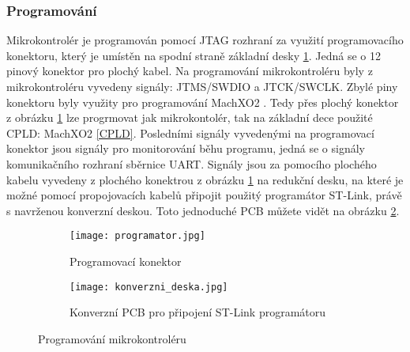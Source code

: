 	\subsubsection{Programování}
	Mikrokontrolér je programován pomocí JTAG rozhraní za využití programovacího konektoru, který je umístěn na spodní straně základní desky \ref{fig:programator}. Jedná se o 12 pinový konektor pro plochý kabel. Na programování mikrokontroléru byly z mikrokontroléru vyvedeny signály: JTMS/SWDIO a JTCK/SWCLK. Zbylé piny konektoru byly využity pro programování MachXO2 \cite{CPLD}. Tedy přes plochý konektor z obrázku \ref{fig:programator} lze progrmovat jak mikrokontolér, tak na základní dece použité CPLD: MachXO2 \ref{CPLD}. Posledními signály vyvedenými na programovací konektor jsou signály pro monitorování běhu programu, jedná se o signály komunikačního rozhraní sběrnice UART. Signály jsou za pomocího plochého kabelu vyvedeny z plochého konektrou z obrázku \ref{fig:programator} na redukční desku, na které je možné pomocí propojovacích kabelů připojit použitý programátor ST-Link, právě s navrženou konverzní deskou. Toto jednoduché PCB můžete vidět na obrázku \ref{fig:konverzni_deska}. 
\begin{figure}[h!]
	\begin{subfigure}{0.5\textwidth}
		\centering
		\captionsetup{justification=centering}
		\texttt{[image: programator.jpg]}
		\caption{Programovací konektor} 
		\label{fig:programator}
	\end{subfigure}
	\begin{subfigure}{0.5\textwidth}
		\centering
		\captionsetup{justification=centering}
		\texttt{[image: konverzni\_deska.jpg]}
		\caption{Konverzní PCB pro připojení ST-Link programátoru} 
		\label{fig:konverzni_deska}
	\end{subfigure}
	\caption{Programování mikrokontroléru}
	\label{fig:programovani}
\end{figure} 

